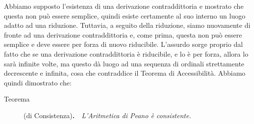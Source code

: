 		Abbiamo supposto l'esistenza di una derivazione contraddittoria e mostrato che questa non può essere semplice, quindi esiste certamente al suo interno un luogo adatto ad una riduzione. Tuttavia, a seguito della riduzione, siamo nuovamente di fronte ad una derivazione contraddittoria e, come prima, questa non può essere semplice e deve essere per forza di nuovo riducibile. L'assurdo sorge proprio dal fatto che se una derivazione contraddittoria è riducibile, e lo è per forza, allora lo sarà infinite volte, ma questo dà luogo ad una sequenza di ordinali strettamente decrescente e infinita, cosa che contraddice il Teorema di Accessibilità. Abbiamo quindi dimostrato che:
	\begin{description}
		\item[Teorema](di Consistenza)\textbf{.}\ \ \textit{L'Aritmetica di Peano è consistente.}
	\end{description}